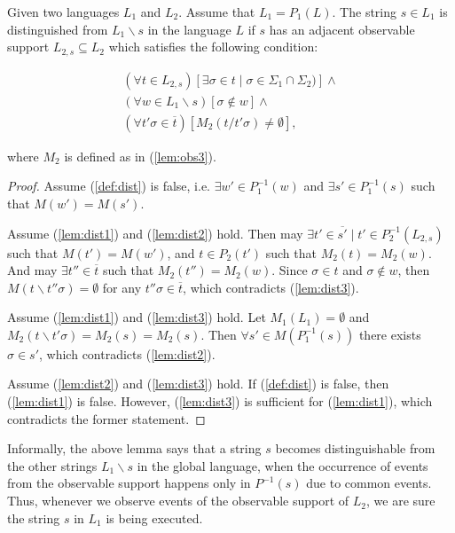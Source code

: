 \documentclass[letterpaper, 10pt, conference]{ieeeconf}
\begin{document}
\begin{lemma}
\label{lem:distinguished}
Given two languages $L_1$ and $L_2$. Assume that $L_1 = P_1(L)$. The string $s
\in L_1$ is distinguished from $L_1\backslash s$ in the language $L$ if $s$ has
an adjacent observable support $L_{2,s} \subseteq L_2$ which
satisfies the following condition:
\end{lemma}
\begin{subequations}
\begin{align}
	(\forall t \in L_{2,s})
	\left[ \exists \sigma \in t \mid \sigma \in \Sigma_1 \cap \Sigma_2)\right]
	\land
	\label{lem:dist1}
	\\
	(\forall w \in L_1\backslash s)\left[\sigma \not \in w \right]
	\label{lem:dist2} \land
	\\
	(\forall t'\sigma \in \overline{t})
	[M_2(t / t'\sigma) \neq \emptyset]
	\label{lem:dist3},
\end{align}
\end{subequations}

where $M_2$ is defined as in (\ref{lem:obs3}). 

\begin{proof}
Assume (\ref{def:dist}) is false, i.e. $\exists w' \in P_1^{-1}(w)$ and $\exists
s' \in P_1^{-1}(s)$ such that $M(w') = M(s')$. 

Assume (\ref{lem:dist1}) and (\ref{lem:dist2}) hold. Then may $\exists t' \in
\overline{s'} \mid t' \in P_2^{-1}(L_{2,s})$ such that $M(t') = M(w')$, and $t
\in P_2(t')$ such that $M_2(t) = M_2(w)$. And may $\exists t'' \in \overline{t}$
such that $M_2(t'') = M_2(w)$. Since $\sigma \in t$ and $\sigma \not \in w$,
then $M(t \backslash t''\sigma) = \emptyset$ for any $t''\sigma \in
\overline{t}$, which contradicts (\ref{lem:dist3}).

Assume (\ref{lem:dist1}) and (\ref{lem:dist3}) hold. Let $M_1(L_1) = \emptyset$
and $M_2(t\backslash t'\sigma) = M_2(s) = M_2(s)$. Then $\forall s' \in
M(P_1^{-1}(s))$ there exists $\sigma \in s'$, which contradicts
(\ref{lem:dist2}).

Assume (\ref{lem:dist2}) and (\ref{lem:dist3}) hold. If (\ref{def:dist}) is
false, then (\ref{lem:dist1}) is false. However, (\ref{lem:dist3}) is sufficient
for (\ref{lem:dist1}), which contradicts the former statement.
\end{proof}

Informally, the above lemma says that a string $s$ becomes distinguishable from
the other strings $L_1\backslash s$ in the global language, when the occurrence
of events from the observable support happens only in $P^{-1}(s)$ due to
common events. Thus, whenever we observe events of the observable support of
$L_2$, we are sure the string $s$ in $L_1$ is being executed.
\end{document}
